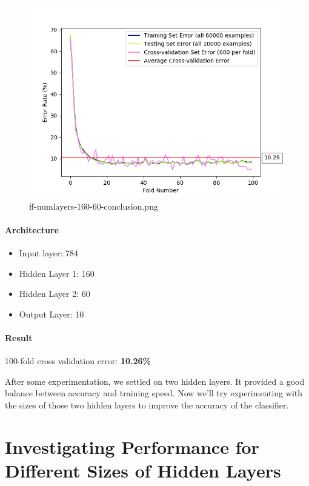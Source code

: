 \documentclass[11pt]{article}
\makeatletter
\def\maxwidth{\ifdim\Gin@nat@width>\linewidth\linewidth
    \else\Gin@nat@width\fi}
\let\Oldincludegraphics\includegraphics
\renewcommand{\includegraphics}[1]{\Oldincludegraphics[width=.8\maxwidth]{#1}}
\providecommand{\tightlist}{%
      \setlength{\itemsep}{0pt}\setlength{\parskip}{0pt}}
\makeatother
\begin{document}
\begin{figure}[htbp]
\centering
\includegraphics{plots/ff-numlayers-160-60-conclusion.png}
\caption{ff-numlayers-160-60-conclusion.png}
\end{figure}

\paragraph{Architecture}\label{architecture-5}

\begin{itemize}
\tightlist
\item
  Input layer: 784
\item
  Hidden Layer 1: 160
\item
  Hidden Layer 2: 60
\item
  Output Layer: 10
\end{itemize}

\paragraph{Result}\label{result-4}

100-fold cross validation error: \textbf{10.26\%}

After some experimentation, we settled on two hidden layers. It provided
a good balance between accuracy and training speed. Now we'll try
experimenting with the sizes of those two hidden layers to improve the
accuracy of the classifier.

\pagebreak

    \section{Investigating Performance for Different Sizes of Hidden
Layers}\label{investigating-performance-for-different-sizes-of-hidden-layers}
\end{document}
